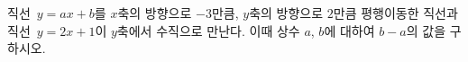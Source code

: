 직선~$y=ax+b$를 $x$축의 방향으로 $-3$만큼, $y$축의 방향으로 $2$만큼 평행이동한 직선과 직선~$y=2x+1$이 $y$축에서 수직으로 만난다. 이때 상수 $a$, $b$에 대하여 $b-a$의 값을 구하시오.
